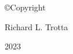 \chapter[Copyrights]{\label{Copyrights}}

\begin{center}
  \vspace*{\fill}
  {\copyright\hspace{2mm}Copyright\par}
  {Richard L. Trotta\par}
  {2023}
  \vspace*{\fill}
\end{center}  